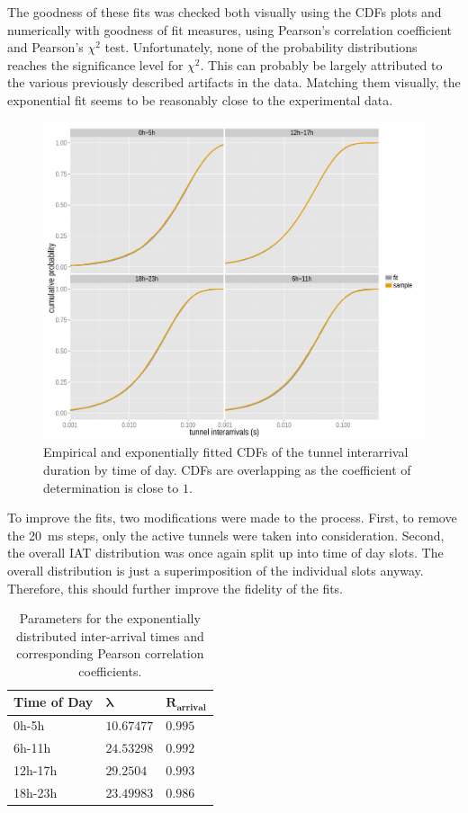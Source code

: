 The goodness of these fits was checked both visually using the \glspl{CDF} plots and numerically with goodness of fit measures, using Pearson's correlation coefficient and Pearson's $\chi^2$ test. Unfortunately, none of the probability distributions reaches the significance level for $\chi^2$. This can probably be largely attributed to the various previously described artifacts in the data. Matching them visually, the exponential fit seems to be reasonably close to the experimental data.

\begin{figure}[htb]
	\centering
	\includegraphics[width=1.0\textwidth]{images/R-IAT-active-fit-cdf-facets.pdf}
	\caption{Empirical and exponentially fitted \glspl{CDF} of the tunnel interarrival duration by time of day. \glspl{CDF} are overlapping as the coefficient of determination is close to $1$.}
\label{c4:fig:pdparrivalsecdf}
\end{figure}

To improve the fits, two modifications were made to the process. First, to remove the \SI{20}{\milli\second} steps, only the active tunnels were taken into consideration. Second, the overall \gls{IAT} distribution was once again split up into time of day slots. The overall distribution is just a superimposition of the individual slots anyway. Therefore, this should further improve the fidelity of the fits.

\begin{table}[htb]
\caption{Parameters for the exponentially distributed inter-arrival times and corresponding Pearson correlation coefficients.}
\label{c4:tab:IAT-fits}
	\centering
	\begin{tabu}{X[0.9,l]X[r]X[r]} 
	\toprule
	\textbf{Time of Day} & $\mathbf{\lambda}$ & $\mathbf{R_{arrival}}$\\ 
	\midrule
	0h-5h   & $10.67477$ & $0.995$ \\
	6h-11h  & $24.53298$ & $0.992$ \\
	12h-17h & $29.2504$  & $0.993$ \\
	18h-23h & $23.49983$ & $0.986$ \\
	\bottomrule
	\end{tabu}
\end{table}

